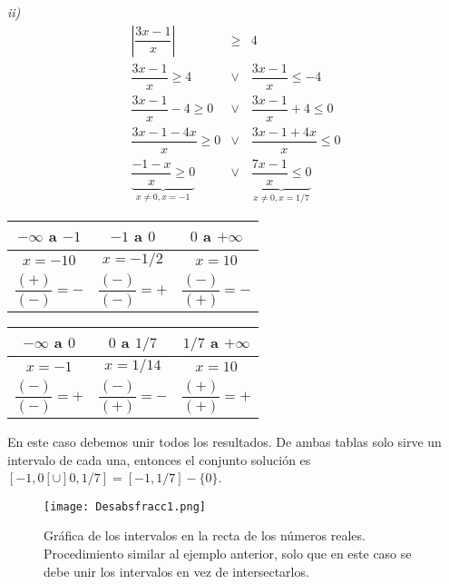 \begin{myexample}
\noindent\textit{ii)}\\
\begin{eqnarray*}
\left|\dfrac{3x-1}{x}\right| &\geq &4  \\
\dfrac{3x-1}{x}\geq 4 &\vee & \dfrac{3x-1}{x}\leq -4\\
\dfrac{3x-1}{x}-4\geq 0 &\vee & \dfrac{3x-1}{x}+4\leq 0\\
\dfrac{3x-1-4x}{x}\geq 0 &\vee & \dfrac{3x-1+4x}{x}\leq 0\\
\underbrace{\dfrac{-1-x}{x}\geq 0}_{x\neq 0, x=-1} &\vee & \underbrace{\dfrac{7x-1}{x}\leq 0}_{x\neq 0, x=1/7}
\end{eqnarray*}
\end{myexample}

\begin{minipage}{0.5\textwidth}
\begin{tabular}{|c|c|c|}
\hline
  $-\infty$ a $-1$ & $-1$ a $0$ & $0$ a $+\infty$ \\
\hline
 $x=-10$ & $x=-1/2$ & $x=10$  \\
  $\dfrac{(+)}{(-)}=-$&$\dfrac{(-)}{(-)}=+$&$\dfrac{(-)}{(+)}=-$\\
\hline
\end{tabular}
\end{minipage}
\begin{minipage}{0.5\textwidth}
\begin{tabular}{|c|c|c|}
\hline
 $-\infty$ a $0$ & $0$ a $1/7$& $1/7$ a $+\infty$    \\
\hline
 $x=-1$&$x=1/14$&$x=10$   \\
  $\dfrac{(-)}{(-)}=+$& $\dfrac{(-)}{(+)}=-$& $\dfrac{(+)}{(+)}=+$ \\
  \hline
\end{tabular}
\end{minipage}

En este caso debemos unir todos los resultados. De ambas tablas solo sirve un intervalo de cada una, entonces el conjunto solución es $[-1,0[\cup ]0,1/7]=[-1,1/7]-\{0\}$.

\begin{center}
\begin{figure}[h!]
\centering
\texttt{[image: Desabsfracc1.png]}
\caption[Gráfica de los intervalos en la recta de los números reales.]{Gráfica de los intervalos en la recta de los números reales. Procedimiento similar al ejemplo anterior, solo que en este caso se debe unir los intervalos en vez de intersectarlos.}
\end{figure}
\end{center}